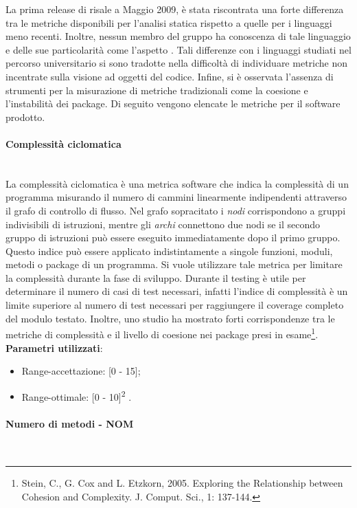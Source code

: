 		La prima release di  risale a Maggio 2009, è stata riscontrata una forte differenza tra le metriche disponibili per l'analisi statica rispetto a quelle per i linguaggi meno recenti. Inoltre, nessun membro del gruppo ha conoscenza di tale linguaggio e delle sue particolarità come l'aspetto . Tali differenze con i linguaggi studiati nel percorso universitario si sono tradotte nella difficoltà di individuare metriche non incentrate sulla visione ad oggetti del codice. Infine, si è osservata l'assenza di strumenti per la misurazione di metriche tradizionali come la coesione e l'instabilità dei package.
		Di seguito vengono elencate le metriche per il software prodotto.
		
			\paragraph{Complessità ciclomatica}\mbox{} \\
				
			La complessità ciclomatica è una metrica software che indica la complessità di un programma misurando il numero di cammini linearmente indipendenti attraverso il grafo di controllo di flusso. Nel grafo sopracitato i \emph{nodi} corrispondono a gruppi indivisibili di istruzioni, mentre gli \emph{archi} connettono due nodi se il secondo gruppo di istruzioni può essere eseguito immediatamente dopo il primo gruppo.
			Questo indice può essere applicato indistintamente a singole funzioni, moduli, metodi o package di un programma.
			Si vuole utilizzare tale metrica per limitare la complessità durante la fase di sviluppo.
			Durante il testing è utile per determinare il numero di casi di test necessari, infatti l'indice di complessità è un limite superiore al numero di test necessari per raggiungere il coverage completo del modulo testato. Inoltre, uno studio ha mostrato forti corrispondenze tra le metriche di complessità e il livello di coesione nei package presi in esame\footnote{Stein, C., G. Cox and L. Etzkorn, 2005. Exploring the Relationship between Cohesion and Complexity. J. Comput. Sci., 1: 137-144.}.\\
			\textbf{Parametri utilizzati}:
			\begin{itemize}
				\item Range-accettazione: [0 - 15];
				\item Range-ottimale: [0 - 10]\textsuperscript{2} .
			\end{itemize}

			
			\paragraph{Numero di metodi - NOM}\mbox{} \\
				
